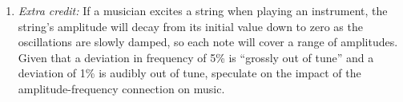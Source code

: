 \documentclass[12pt]{article}
\begin{document}
\begin{enumerate}
{Gather two sets of data: one for the $n=1$ and one for the $n=4$ mode. Plot them on top of each other, and determine which normal mode is most subject to large-amplitude effects.}

\item{{\it Extra credit:} If a musician excites a string when playing an instrument, the string's amplitude will decay from its initial value down to zero as the oscillations are slowly damped, so each note will cover a range of amplitudes. 
Given that a deviation in frequency of 5\% is ``grossly out of tune'' and a deviation of 1\% is audibly out of tune, speculate on the impact of the amplitude-frequency connection on music.}

 \end{enumerate}
\end{document}
